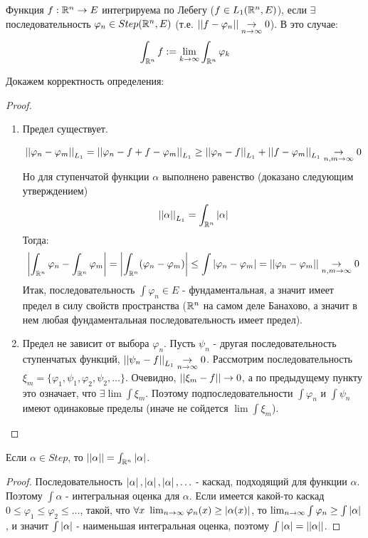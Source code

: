 \begin{definition*}
    Функция $f:\mathbb{R}^n \to E$ интегрируема по Лебегу ($f\in L_1(\mathbb{R}^n, E)$), если $\exists$ последовательность $\varphi_n \in Step(\mathbb{R}^n, E)$ (т.е. $\left| \left| f - \varphi_n \right| \right| \underset{n \to\infty}{\to} 0$). В это случае:
    \[\int_{\mathbb{R}^n} f := \lim_{k \to \infty} \int_{\mathbb{R}^n} \varphi_k\]

    Докажем корректность определения:
    \begin{proof}
        \begin{enumerate}
            \item Предел существует.
            \par
            \[\left| \left| \varphi_n - \varphi_m \right| \right|_{L_1} = \left| \left| \varphi_n - f + f - \varphi_m \right| \right|_{L_1} \ge \left| \left| \varphi_n - f \right| \right|_{L_1} + \left| \left| f - \varphi_m \right| \right|_{L_1} \underset{n, m \to \infty}{\to} 0\]
            Но для ступенчатой функции $\alpha$ выполнено равенство (доказано следующим утверждением)
            \[\left| \left| \alpha \right| \right|_{L_1} = \int_{\mathbb{R}^n} \left| \alpha \right|\]
            Тогда:
            \[\left| \int_{\mathbb{R}^n}\varphi_n - \int_{\mathbb{R}^n}\varphi_m \right| = \left| \int_{\mathbb{R}^n} (\varphi_n - \varphi_m) \right| \le \int \left| \varphi_n - \varphi_m \right| = \left| \left| \varphi_n - \varphi_m \right| \right| \underset{n, m \to \infty}{\to} 0\]
            Итак, последовательность $\int \varphi_n \in E$ - фундаментальная, а значит имеет предел в силу свойств пространства ($\mathbb{R}^n$ на самом деле Банахово, а значит в нем любая фундаментальная последовательность имеет предел).

            \item Предел не зависит от выбора $\varphi_n$.
            Пусть $\psi_n$ - другая последовательность ступенчатых функций, $\left| \left| \psi_n - f \right| \right|_{L_1} \underset{n \to \infty}{\to} 0$. Рассмотрим последовательность $\xi_m = \{\varphi_1, \psi_1, \varphi_2, \psi_2, \hdots\}$. Очевидно, $\left| \left| \xi_m - f \right| \right| \to 0$, а по предыдущему пункту это означает, что $\exists \lim \int \xi_m$.
            Поэтому подпоследовательности $\int \varphi_n$ и $\int \psi_n$ имеют одинаковые пределы (иначе не сойдется $\lim \int \xi_m$).
        \end{enumerate}
    \end{proof}
\end{definition*}

\begin{statement*}
    Если $\alpha \in Step$, то $\left| \left| \alpha \right| \right| = \int_{\mathbb{R}^n}\left| \alpha \right|$.
    \begin{proof}
        Последовательность $\left| \alpha \right|, \left| \alpha \right|, \left| \alpha \right|, \hdots$ - каскад, подходящий для функции $\alpha$. Поэтому $\int \alpha$ - интегральная оценка для $\alpha$. Если имеется какой-то каскад $0 \le \varphi_1 \le \varphi_2 \le \hdots$, такой, что $\forall x \ \lim_{n \to \infty} \varphi_n(x) \ge \left| \alpha(x) \right|$,
        то $\lim_{n \to \infty} \int \varphi_n \ge \int \left| \alpha \right|$, и значит $\int \left| \alpha \right|$ - наименьшая интегральная оценка, поэтому $\int \left| \alpha \right| = \left| \left| \alpha \right| \right|$.
    \end{proof}
\end{statement*}

